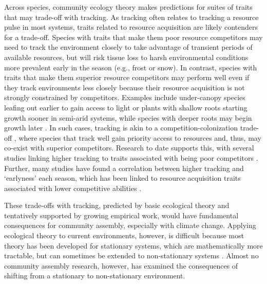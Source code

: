 \documentclass[11pt,letterpaper]{article}
\begin{document}
Across species, community ecology theory makes predictions for suites of traits that may trade-off with tracking. As tracking often relates to tracking a resource pulse in most systems, traits related to resource acquisition are likely contenders for a trade-off. Species with traits that make them poor resource competitors may need to track the environment closely to take advantage of transient periods of available resources, but will risk tissue loss to harsh environmental conditions more prevalent early in the season (e.g., frost or snow). In contrast, species with traits that make them superior resource competitors may perform well even if they track environments less closely because their resource acquisition is not strongly constrained by competitors. Examples include under-canopy species leafing out earlier to gain access to light \citep{heberling2019} or plants with shallow roots starting growth sooner in semi-arid systems, while species with deeper roots may begin growth later \citep{Zhu2016BioLetters}. In such cases, tracking is akin to a competition-colonization trade-off \citep{Amarasekare:2003tq}, where species that track well gain priority access to resources and, thus, may co-exist with superior competitors. Research to date supports this, with several studies linking higher tracking to traits associated with being poor competitors \citep{Dorji2013,lasky2016,Zhu2016BioLetters}. Further, many studies have found a correlation between higher tracking and `earlyness' each season, which has been linked to resource acquisition traits associated with lower competitive abilities \citep[][see Box `Trait trade-offs with tracking']{wolkovich2014aob}. 

These trade-offs with tracking, predicted by basic ecological theory and tentatively supported by growing empirical work, would have fundamental consequences for community assembly, especially with climate change. Applying ecological theory to current environments, however, is difficult because most theory has been developed for stationary systems, which are mathematically more tractable, but can sometimes be extended to non-stationary systems \citep{chessonnonstat}. Almost no community assembly research, however, has examined the consequences of shifting from a stationary to non-stationary environment. %
\end{document}
